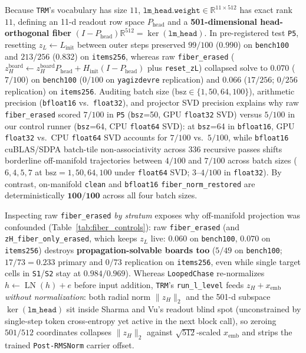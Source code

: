 \documentclass[10pt,letterpaper]{article}
\newcommand{\Phead}{P_{\mathrm{head}}}
\begin{document}
Because \texttt{TRM}'s vocabulary has size $11$, $\texttt{lm\_head.weight} \in \mathbb{R}^{11 \times 512}$ has exact rank $11$, defining an 11-d readout row space $\Phead$ and a \textbf{501-dimensional head-orthogonal fiber} $(I - \Phead)\mathbb{R}^{512} = \ker(\texttt{lm\_head})$. In pre-registered test \texttt{P5}, resetting $z_L \leftarrow L_{\mathrm{init}}$ between outer steps preserved $99/100$ ($0.990$) on \texttt{bench100} and $213/256$ ($0.832$) on \texttt{items256}, whereas raw \texttt{fiber\_erased} ($z_H^{\mathrm{board}} \leftarrow z_H^{\mathrm{board}}\Phead + H_{\mathrm{init}}(I-\Phead)$ plus \texttt{reset\_zL}) collapsed solve to $0.070$ ($7/100$) on \texttt{bench100} ($0/100$ on \texttt{yagizdevre} replication) and $0.066$ ($17/256$; $0/256$ replication) on \texttt{items256}. Auditing batch size ($\mathrm{bsz}\in\{1,50,64,100\}$), arithmetic precision (\texttt{bfloat16} vs.\ \texttt{float32}), and projector SVD precision explains why raw \texttt{fiber\_erased} scored $7/100$ in \texttt{P5} (\texttt{bsz}=50, GPU \texttt{float32} SVD) versus $5/100$ in our control runner (\texttt{bsz}=64, CPU \texttt{float64} SVD): at \texttt{bsz}=64 in \texttt{bfloat16}, GPU \texttt{float32} vs.\ CPU \texttt{float64} SVD accounts for $7/100$ vs.\ $5/100$, while \texttt{bfloat16} cuBLAS/SDPA batch-tile non-associativity across 336 recursive passes shifts borderline off-manifold trajectories between $4/100$ and $7/100$ across batch sizes ($6, 4, 5, 7$ at $\mathrm{bsz}=1, 50, 64, 100$ under \texttt{float64} SVD; $3$--$4/100$ in \texttt{float32}). By contrast, on-manifold \texttt{clean} and \texttt{bfloat16} \texttt{fiber\_norm\_restored} are deterministically $\mathbf{100/100}$ across all four batch sizes.

Inspecting raw \texttt{fiber\_erased} \emph{by stratum} exposes why off-manifold projection was confounded (Table~\ref{tab:fiber_controls}): raw \texttt{fiber\_erased} (and \texttt{zH\_fiber\_only\_erased}, which keeps $z_L$ live: $0.060$ on \texttt{bench100}, $0.070$ on \texttt{items256}) destroys \textbf{propagation-solvable boards too} ($5/49$ on \texttt{bench100}; $17/73 = 0.233$ primary and $0/73$ replication on \texttt{items256}, even while single target cells in \texttt{S1}/\texttt{S2} stay at $0.984/0.969$). Whereas \texttt{LoopedChase} re-normalizes $h \leftarrow \operatorname{LN}(h) + e$ before input addition, \texttt{TRM}'s \texttt{run\_l\_level} feeds $z_H + x_{\mathrm{emb}}$ \emph{without normalization}: both radial norm $\|z_H\|_2$ and the 501-d subspace $\ker(\texttt{lm\_head})$ sit inside Sharma and Vu's \cite{sharma2026dense} readout blind spot (unconstrained by single-step token cross-entropy yet active in the next block call), so zeroing $501/512$ coordinates collapses $\|z_H\|_2$ against $\sqrt{512}$-scaled $x_{\mathrm{emb}}$ and strips the trained \texttt{Post-RMSNorm} carrier offset.
\end{document}
